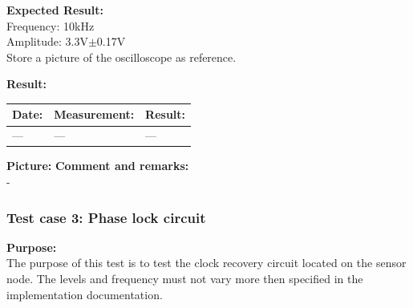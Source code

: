 \begin{figure}[H]
	\centering
\end{figure}

\textbf{Expected Result:}\\
Frequency: 10kHz\\
Amplitude: 3.3V$\pm$0.17V\\
Store a picture of the oscilloscope as reference.


\textbf{Result:}
\begin{table}[H]
\centering
\begin{tabular}{|p{2cm}|p{3cm}|p{2cm}|}\hline
\textbf{Date:} & \textbf{Measurement:} & \textbf{Result:} \\ \hline
--- & --- & --- \\ \hline
\end{tabular}
\end{table}
\textbf{Picture:}
\textbf{Comment and remarks:}\\
-\\

\subsubsection{Test case 3: Phase lock circuit}
\textbf{Purpose:}\\
The purpose of this test is to test the clock recovery circuit located on the sensor node. The levels and frequency must not vary more then specified in the implementation documentation.\\

